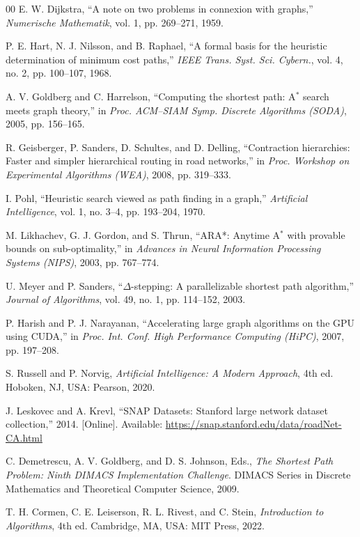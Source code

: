 \documentclass[conference,10pt]{IEEEtran}
\newcommand{\Astar}{A$^\ast$}
\begin{document}
\begin{thebibliography}{00}
E. W. Dijkstra, ``A note on two problems in connexion with graphs,''
\emph{Numerische Mathematik}, vol. 1, pp. 269--271, 1959.

P. E. Hart, N. J. Nilsson, and B. Raphael, ``A formal basis for the heuristic
determination of minimum cost paths,'' \emph{IEEE Trans. Syst. Sci. Cybern.},
vol. 4, no. 2, pp. 100--107, 1968.

A. V. Goldberg and C. Harrelson, ``Computing the shortest path: \Astar{} search
meets graph theory,'' in \emph{Proc. ACM--SIAM Symp. Discrete Algorithms
(SODA)}, 2005, pp. 156--165.

R. Geisberger, P. Sanders, D. Schultes, and D. Delling, ``Contraction
hierarchies: Faster and simpler hierarchical routing in road networks,'' in
\emph{Proc. Workshop on Experimental Algorithms (WEA)}, 2008, pp. 319--333.

I. Pohl, ``Heuristic search viewed as path finding in a graph,''
\emph{Artificial Intelligence}, vol. 1, no. 3--4, pp. 193--204, 1970.

M. Likhachev, G. J. Gordon, and S. Thrun, ``ARA*: Anytime \Astar{} with
provable bounds on sub-optimality,'' in \emph{Advances in Neural Information
Processing Systems (NIPS)}, 2003, pp. 767--774.

U. Meyer and P. Sanders, ``$\Delta$-stepping: A parallelizable shortest path
algorithm,'' \emph{Journal of Algorithms}, vol. 49, no. 1, pp. 114--152, 2003.

P. Harish and P. J. Narayanan, ``Accelerating large graph algorithms on the GPU
using CUDA,'' in \emph{Proc. Int. Conf. High Performance Computing (HiPC)},
2007, pp. 197--208.

S. Russell and P. Norvig, \emph{Artificial Intelligence: A Modern Approach},
4th ed. Hoboken, NJ, USA: Pearson, 2020.

J. Leskovec and A. Krevl, ``SNAP Datasets: Stanford large network dataset
collection,'' 2014. [Online]. Available:
\url{https://snap.stanford.edu/data/roadNet-CA.html}

C. Demetrescu, A. V. Goldberg, and D. S. Johnson, Eds., \emph{The Shortest Path
Problem: Ninth DIMACS Implementation Challenge}. DIMACS Series in Discrete
Mathematics and Theoretical Computer Science, 2009.

T. H. Cormen, C. E. Leiserson, R. L. Rivest, and C. Stein, \emph{Introduction
to Algorithms}, 4th ed. Cambridge, MA, USA: MIT Press, 2022.
\end{thebibliography}
\end{document}
